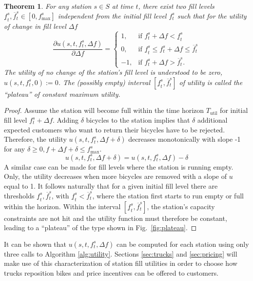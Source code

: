 \documentclass{article}
\providecommand{\Tutil}{T_{\textrm{util}}}
\newtheorem{theorem}{Theorem}
\begin{document}
\begin{theorem}
  \label{eq:theorem1}
  For any station $s\in S$ at time $t$, there exist two fill levels $\underline f^s_t,
  \overline f^s_t \in [0, f^s_{\max}]$ independent from the initial fill level
  $f^s_t$ such that for the utility of change in fill level $\Delta f$
  \begin{equation}
    \frac{\partial u(s,t,f^s_t,\Delta f)}{\partial\Delta f} = \begin{cases}
      1, &\text{if } f^s_t+\Delta f < \underline f^s_t \\
      0, & \text{if } \underline f^s_t \leq f^s_t+\Delta f \leq \overline f^s_t\\
      -1, & \text{if } f^s_t+\Delta f > \overline f^s_t.
    \end{cases}
    \label{eq:udiff}
  \end{equation}
  The utility of no change of the station's fill level is understood to be zero,
  $u(s,t,f^s_t,0) := 0$. The (possibly empty) interval $[\underline f^s_t,
  \overline f^s_t]$ of utility is called the ``plateau'' of constant maximum
  utility.
\end{theorem}
\begin{proof}
  Assume the station will become full within the time horizon $\Tutil$ for
  initial fill level $f^s_t+\Delta f$. Adding $\delta$ bicycles to the station
  implies that $\delta$ additional expected customers who want to return their
  bicycles have to be rejected. Therefore, the utility $u(s,t,f^s_t,\Delta f+\delta)$
  decreases monotonically with slope -1 for any $\delta \geq 0, f+\Delta f+\delta \leq f^s_{\max}$.
  \[u(s,t,f^s_t,\Delta f+\delta) = u(s,t,f^s_t,\Delta f)-\delta\] A similar case
  can be made for fill levels where the station is running empty. Only, the
  utility decreases when more bicycles are removed with a slope of $u$ equal to
  1. It follows naturally that for a given initial fill level there are
  thresholds $\underline f^s_t, \overline f^s_t$, with $\underline f^s_t <
  \overline f^s_t$, where the station first starts to run empty or full within
  the horizon. Within the interval $[\underline f^s_t, \overline f^s_t]$, the
  station's capacity constraints are not hit and the utility function must
  therefore be constant, leading to a ``plateau'' of the type shown in
  Fig.~\ref{fig:plateau}.
\end{proof}




It can be shown that $u(s,t,f^s_t,\Delta f)$ can be computed for each station using
only three calls to Algorithm \ref{alg:utility}. Sections \ref{sec:trucks} and
\ref{sec:pricing} will make use of this characterization of station fill
utilities in order to choose how trucks reposition bikes and price incentives
can be offered to customers.
\end{document}
